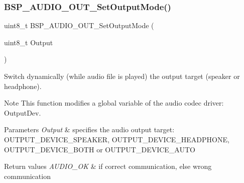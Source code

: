\mbox{\label{group___s_t_m32_f4___d_i_s_c_o_v_e_r_y___a_u_d_i_o___o_u_t___exported___functions_gacd0d9e6eb0ff2569cf6c4b92fc359484}} 
\subsubsection{\texorpdfstring{B\+S\+P\+\_\+\+A\+U\+D\+I\+O\+\_\+\+O\+U\+T\+\_\+\+Set\+Output\+Mode()}{BSP\_AUDIO\_OUT\_SetOutputMode()}}
{\footnotesize\ttfamily uint8\+\_\+t B\+S\+P\+\_\+\+A\+U\+D\+I\+O\+\_\+\+O\+U\+T\+\_\+\+Set\+Output\+Mode (\begin{DoxyParamCaption}\item[{uint8\+\_\+t}]{Output }\end{DoxyParamCaption})}



Switch dynamically (while audio file is played) the output target (speaker or headphone). 

\begin{DoxyNote}{Note}
This function modifies a global variable of the audio codec driver\+: Output\+Dev. 
\end{DoxyNote}

\begin{DoxyParams}{Parameters}
{\em Output} & specifies the audio output target\+: O\+U\+T\+P\+U\+T\+\_\+\+D\+E\+V\+I\+C\+E\+\_\+\+S\+P\+E\+A\+K\+ER, O\+U\+T\+P\+U\+T\+\_\+\+D\+E\+V\+I\+C\+E\+\_\+\+H\+E\+A\+D\+P\+H\+O\+NE, O\+U\+T\+P\+U\+T\+\_\+\+D\+E\+V\+I\+C\+E\+\_\+\+B\+O\+TH or O\+U\+T\+P\+U\+T\+\_\+\+D\+E\+V\+I\+C\+E\+\_\+\+A\+U\+TO \\
\hline
\end{DoxyParams}

\begin{DoxyRetVals}{Return values}
{\em A\+U\+D\+I\+O\+\_\+\+OK} & if correct communication, else wrong communication \\
\hline
\end{DoxyRetVals}


